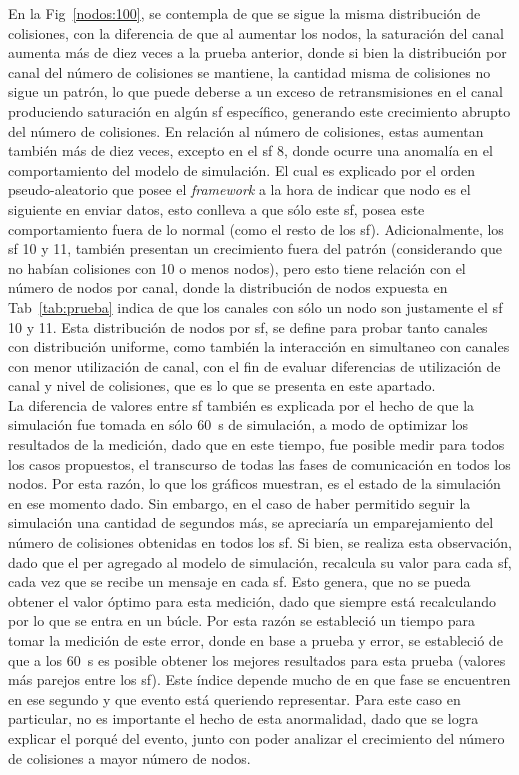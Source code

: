 \begin{justify}
En la Fig~\ref{nodos:100}, se contempla de que se sigue la misma distribución de colisiones, con la diferencia de que al aumentar los nodos, la saturación del canal  aumenta más de diez veces a la prueba anterior, donde si bien la distribución por canal del número de colisiones se mantiene, la cantidad misma de colisiones no sigue un patrón, lo que puede deberse a un exceso de retransmisiones en el canal produciendo saturación en algún \gls{sf} específico, generando este crecimiento abrupto del número de colisiones. En relación al número de colisiones, estas aumentan también más de diez veces, excepto en el \gls{sf} 8, donde ocurre una anomalía en el comportamiento del modelo de simulación. El cual es explicado por el orden pseudo-aleatorio que posee el \textit{framework} a la hora de indicar que nodo es el siguiente en enviar datos, esto conlleva a que sólo este \gls{sf}, posea este comportamiento fuera de lo normal (como el resto de los \gls{sf}). Adicionalmente, los \gls{sf} 10 y 11, también presentan un crecimiento fuera del patrón (considerando que no habían colisiones con 10 o menos nodos), pero esto tiene relación con el número de nodos por canal, donde la distribución de nodos expuesta en Tab~\ref{tab:prueba} indica de que los canales con sólo un nodo son justamente el \gls{sf} 10 y 11. Esta distribución de nodos por \gls{sf}, se define para probar tanto canales con distribución uniforme, como también la interacción en simultaneo con canales con menor utilización de canal, con el fin de evaluar diferencias de utilización de canal y nivel de colisiones, que es lo que se presenta en este apartado.\\
La diferencia de valores entre \gls{sf} también es explicada por el hecho de que la simulación fue tomada en sólo \SI{60}{s} de simulación, a modo de optimizar los resultados de la medición, dado que en este tiempo, fue posible medir para todos los casos propuestos, el transcurso de todas las fases de comunicación en todos los nodos. Por esta razón, lo que los gráficos muestran, es el estado de la simulación en ese momento dado. Sin embargo, en el caso de haber permitido seguir la simulación una cantidad de segundos más, se apreciaría un emparejamiento del número de colisiones obtenidas en todos los \gls{sf}. Si bien, se realiza esta observación, dado que el \gls{per} agregado al modelo de simulación, recalcula su valor para cada \gls{sf}, cada vez que se recibe un mensaje en cada \gls{sf}. Esto genera, que no se pueda obtener el valor óptimo para esta medición, dado que siempre está recalculando por lo que se entra en un búcle. Por esta razón se estableció un tiempo para tomar la medición de este error, donde en base a prueba y error, se estableció de que a los \SI{60}{s} es posible obtener los mejores resultados para esta prueba (valores más parejos entre los \gls{sf}). Este índice depende mucho de en que fase se encuentren en ese segundo y que evento está queriendo representar. Para este caso en particular, no es importante el hecho de esta anormalidad, dado que se logra explicar el porqué del evento, junto con poder analizar el crecimiento del número de colisiones a mayor número de nodos.

\end{justify}
